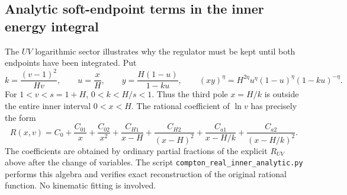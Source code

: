 \subsection{Analytic soft-endpoint terms in the inner energy integral}
The $UV$ logarithmic sector illustrates why the regulator must be
kept until both endpoints have been integrated. Put
\begin{equation}
 k=\frac{(v-1)^2}{Hv},\qquad u=\frac{x}{H},\qquad
 y=\frac{H(1-u)}{1-ku},\qquad
 (xy)^\eta=H^{2\eta}u^\eta(1-u)^\eta(1-ku)^{-\eta}.
\end{equation}
For $1<v<s=1+H$, $0<k<H/s<1$. Thus the third pole
$x=H/k$ is outside the entire inner interval $0<x<H$.
The rational coefficient of $\ln v$ has precisely the form
\begin{equation}
 R(x,v)=C_0+\frac{C_{01}}x+\frac{C_{02}}{x^2}
 +\frac{C_{H1}}{x-H}+\frac{C_{H2}}{(x-H)^2}
 +\frac{C_{a1}}{x-H/k}+\frac{C_{a2}}{(x-H/k)^2}.
\end{equation}
The coefficients are obtained by ordinary partial fractions of the
explicit $R_{UV}$ above after the change of variables.
The script \nolinkurl{compton_real_inner_analytic.py} performs this
algebra and verifies exact reconstruction of the original rational
function. No kinematic fitting is involved.

